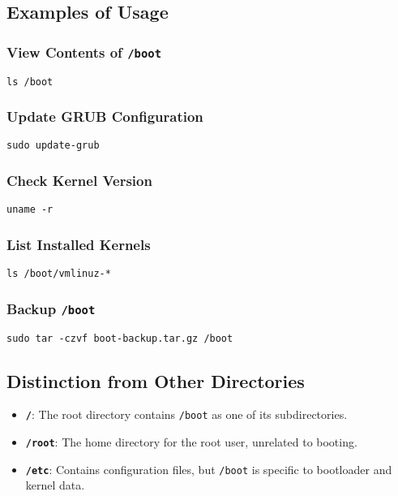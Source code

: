 \subsection*{Examples of Usage}

\subsubsection*{View Contents of \texttt{/boot}}
\begin{lstlisting}
ls /boot
\end{lstlisting}

\subsubsection*{Update GRUB Configuration}
\begin{lstlisting}
sudo update-grub
\end{lstlisting}

\subsubsection*{Check Kernel Version}
\begin{lstlisting}
uname -r
\end{lstlisting}

\subsubsection*{List Installed Kernels}
\begin{lstlisting}
ls /boot/vmlinuz-*
\end{lstlisting}

\subsubsection*{Backup \texttt{/boot}}
\begin{lstlisting}
sudo tar -czvf boot-backup.tar.gz /boot
\end{lstlisting}

\subsection*{Distinction from Other Directories}

\begin{itemize}
    \item \textbf{\texttt{/}}: The root directory contains \texttt{/boot} as one of its subdirectories.
    \item \textbf{\texttt{/root}}: The home directory for the root user, unrelated to booting.
    \item \textbf{\texttt{/etc}}: Contains configuration files, but \texttt{/boot} is specific to bootloader and kernel data.
\end{itemize}

